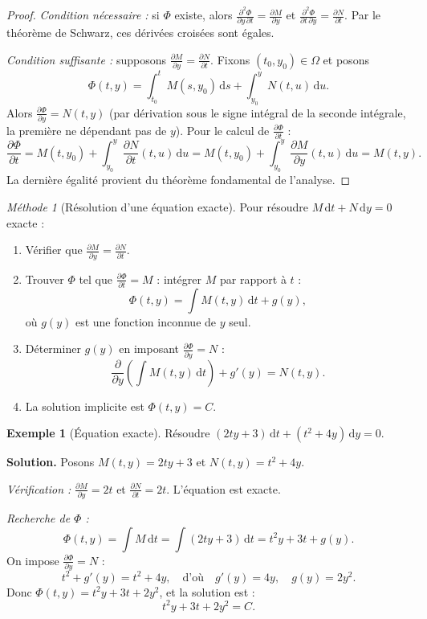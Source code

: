 \documentclass[12pt,a4paper,openany]{book}
\theoremstyle{definition}
\newtheorem{exemple}[definition]{Exemple}
\theoremstyle{plain}
\theoremstyle{remark}
\newtheorem{methode}[definition]{Méthode}
\newcommand{\dd}{\mathrm{d}}
\begin{document}
\begin{proof}
\textit{Condition nécessaire :} si $\Phi$ existe, alors $\frac{\partial^2 \Phi}{\partial y\,\partial t} = \frac{\partial M}{\partial y}$ et $\frac{\partial^2 \Phi}{\partial t\,\partial y} = \frac{\partial N}{\partial t}$. Par le théorème de Schwarz, ces dérivées croisées sont égales.

\textit{Condition suffisante :} supposons $\frac{\partial M}{\partial y} = \frac{\partial N}{\partial t}$. Fixons $(t_0, y_0) \in \Omega$ et posons
\[
\Phi(t, y) = \int_{t_0}^{t} M(s, y_0)\,\dd s + \int_{y_0}^{y} N(t, u)\,\dd u.
\]
Alors $\frac{\partial \Phi}{\partial y} = N(t, y)$ (par dérivation sous le signe intégral de la seconde intégrale, la première ne dépendant pas de $y$). Pour le calcul de $\frac{\partial \Phi}{\partial t}$ :
\[
\frac{\partial \Phi}{\partial t} = M(t, y_0) + \int_{y_0}^{y} \frac{\partial N}{\partial t}(t, u)\,\dd u = M(t, y_0) + \int_{y_0}^{y} \frac{\partial M}{\partial y}(t, u)\,\dd u = M(t, y).
\]
La dernière égalité provient du théorème fondamental de l'analyse.
\end{proof}

\begin{methode}[Résolution d'une équation exacte]
\label{meth:exacte}
Pour résoudre $M\,\dd t + N\,\dd y = 0$ exacte :
\begin{enumerate}
\item Vérifier que $\frac{\partial M}{\partial y} = \frac{\partial N}{\partial t}$.
\item Trouver $\Phi$ tel que $\frac{\partial \Phi}{\partial t} = M$ : intégrer $M$ par rapport à $t$ :
\[
\Phi(t, y) = \int M(t, y)\,\dd t + g(y),
\]
où $g(y)$ est une fonction inconnue de $y$ seul.
\item Déterminer $g(y)$ en imposant $\frac{\partial \Phi}{\partial y} = N$ :
\[
\frac{\partial}{\partial y}\!\left(\int M(t, y)\,\dd t\right) + g'(y) = N(t, y).
\]
\item La solution implicite est $\Phi(t, y) = C$.
\end{enumerate}
\end{methode}

\begin{exemple}[Équation exacte]
\label{ex:exacte-1}
Résoudre $(2ty + 3)\,\dd t + (t^2 + 4y)\,\dd y = 0$.

\textbf{Solution.} Posons $M(t,y) = 2ty + 3$ et $N(t,y) = t^2 + 4y$.

\textit{Vérification :} $\frac{\partial M}{\partial y} = 2t$ et $\frac{\partial N}{\partial t} = 2t$. L'équation est exacte.

\textit{Recherche de $\Phi$ :}
\[
\Phi(t, y) = \int M\,\dd t = \int (2ty + 3)\,\dd t = t^2 y + 3t + g(y).
\]
On impose $\frac{\partial \Phi}{\partial y} = N$ :
\[
t^2 + g'(y) = t^2 + 4y, \quad \text{d'où} \quad g'(y) = 4y, \quad g(y) = 2y^2.
\]
Donc $\Phi(t, y) = t^2 y + 3t + 2y^2$, et la solution est :
\[
\boxed{t^2 y + 3t + 2y^2 = C.}
\]
\end{exemple}
\end{document}
